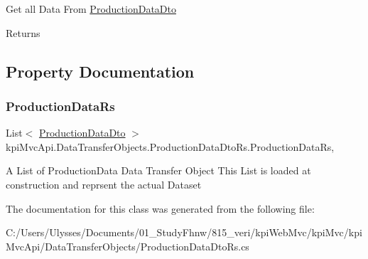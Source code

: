 Get all Data From \hyperlink{classkpi_mvc_api_1_1_data_transfer_objects_1_1_production_data_dto}{Production\+Data\+Dto} 

\begin{DoxyReturn}{Returns}

\end{DoxyReturn}


\subsection{Property Documentation}
\mbox{\label{classkpi_mvc_api_1_1_data_transfer_objects_1_1_production_data_dto_rs_a4f6705f015bff504dffa7567f1df1296}} 
\subsubsection{\texorpdfstring{Production\+Data\+Rs}{ProductionDataRs}}
{\footnotesize\ttfamily List$<$ \hyperlink{classkpi_mvc_api_1_1_data_transfer_objects_1_1_production_data_dto}{Production\+Data\+Dto} $>$ kpi\+Mvc\+Api.\+Data\+Transfer\+Objects.\+Production\+Data\+Dto\+Rs.\+Production\+Data\+Rs\hspace{0.3cm}{\ttfamily [get]}, {\ttfamily [set]}}



A List of Production\+Data Data Transfer Object This List is loaded at construction and reprsent the actual Dataset 



The documentation for this class was generated from the following file\+:\begin{DoxyCompactItemize}
\item 
C\+:/\+Users/\+Ulysses/\+Documents/01\+\_\+\+Study\+Fhnw/815\+\_\+veri/kpi\+Web\+Mvc/kpi\+Mvc/kpi\+Mvc\+Api/\+Data\+Transfer\+Objects/Production\+Data\+Dto\+Rs.\+cs\end{DoxyCompactItemize}
